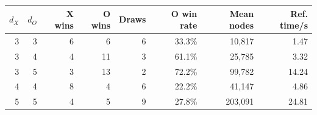 \begin{tabular}{rrrrrrrr}
\toprule
$d_X$ & $d_O$ & X wins & O wins & Draws & O win rate & Mean nodes & Ref. time/s \\
\midrule
3 & 3 & 6 & 6 & 6 & 33.3\% & 10,817 & 1.47 \\
3 & 4 & 4 & 11 & 3 & 61.1\% & 25,785 & 3.32 \\
3 & 5 & 3 & 13 & 2 & 72.2\% & 99,782 & 14.24 \\
4 & 4 & 8 & 4 & 6 & 22.2\% & 41,147 & 4.86 \\
5 & 5 & 4 & 5 & 9 & 27.8\% & 203,091 & 24.81 \\
\bottomrule
\end{tabular}
